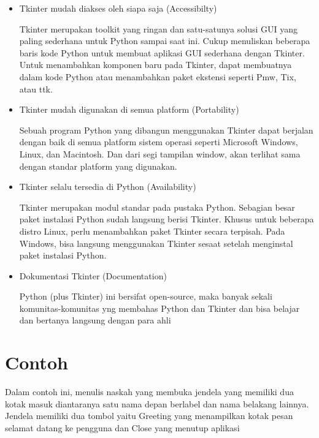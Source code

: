 \begin{itemize}
\item Tkinter mudah diakses oleh siapa saja (Accessibilty)

Tkinter merupakan toolkit yang ringan dan satu-satunya solusi GUI yang paling sederhana untuk Python sampai saat ini. Cukup menuliskan beberapa baris kode Python untuk membuat aplikasi GUI sederhana dengan Tkinter. Untuk menambahkan komponen baru pada Tkinter, dapat membuatnya dalam kode Python atau menambahkan paket ekstensi seperti Pmw, Tix, atau ttk. 
\item Tkinter mudah digunakan di semua platform (Portability)

Sebuah program Python yang dibangun menggunakan Tkinter dapat berjalan dengan baik di semua platform sistem operasi seperti Microsoft Windows, Linux, dan Macintosh. Dan dari segi tampilan window, akan terlihat sama dengan standar platform yang digunakan. 
 
\item Tkinter selalu tersedia di Python (Availability)

Tkinter merupakan modul standar pada pustaka Python. Sebagian besar paket instalasi Python sudah langsung berisi Tkinter. Khusus untuk beberapa distro Linux, perlu menambahkan paket Tkinter secara terpisah. Pada Windows, bisa langsung menggunakan Tkinter sesaat setelah menginstal paket instalasi Python. 
 
\item Dokumentasi Tkinter (Documentation)

Python (plus Tkinter) ini bersifat open-source, maka banyak sekali komunitas-komunitas yng membahas Python dan Tkinter dan bisa belajar dan bertanya langsung dengan para ahli
\end{itemize}

\section{Contoh}
\hspace*{0.5in} Dalam contoh ini, menulis naskah yang membuka jendela yang memiliki dua kotak masuk diantaranya satu nama depan berlabel dan nama belakang lainnya. Jendela memiliki dua tombol yaitu Greeting yang menampilkan kotak pesan selamat datang ke pengguna dan Close yang menutup aplikasi

